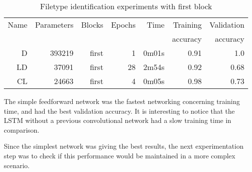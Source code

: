 \begin{table}[!ht]
    \centering
    \caption{Filetype identification experiments with first block}
    \label{tab:carving7-11}
\begin{tabular}{r|r|r|r|r|r|r}
\hline
Name & Parameters & Blocks & Epochs & Time    & Training          & Validation          \\       
     &            &        &        &         &          accuracy &            accuracy \\ \hline\hline

D	& 393219	& first	& 1	    & 0m01s	& 0.91	& 1.0 \\ \hline
LD	& 37091	    & first	& 28	& 2m54s	& 0.92	& 0.68 \\ \hline
CL	& 24663	    & first	& 4	    & 0m05s	& 0.98	& 0.73 \\ \hline
\end{tabular}
\end{table}

The simple feedforward network was the fastest networking concerning training time, and had the best validation accuracy. It is interesting to notice that the LSTM without a previous convolutional network had a slow training time in comparison.

Since the simplest network was giving the best results, the next experimentation step was to check if this performance would be maintained in a more complex scenario.

